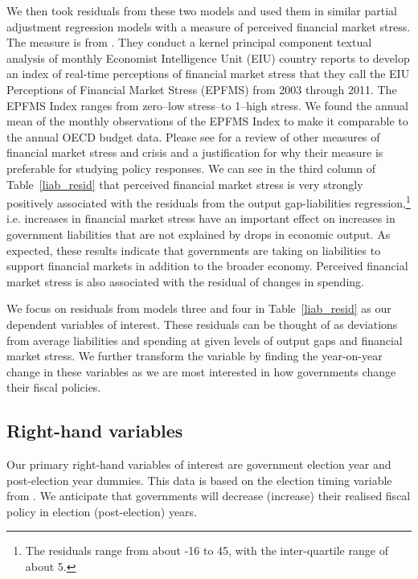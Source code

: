 \documentclass[]{article}
\begin{document}
We then took residuals from these two models and used them in similar partial adjustment regression models with a measure of perceived financial market stress. The measure is from \cite{gandrudHallEPFMS}. They conduct a kernel principal component textual analysis \citep{Spirling2012} of monthly Economist Intelligence Unit (EIU) country reports to develop an index of real-time perceptions of financial market stress that they call the EIU Perceptions of Financial Market Stress (EPFMS) from 2003 through 2011. The EPFMS Index ranges from zero--low stress--to 1--high stress. We found the annual mean of the monthly observations of the EPFMS Index to make it comparable to the annual OECD budget data. Please see \cite{gandrudHallEPFMS} for a review of other measures of financial market stress and crisis and a justification for why their measure is preferable for studying policy responses. We can see in the third column of Table~\ref{liab_resid} that perceived financial market stress is very strongly positively associated with the residuals from the output gap-liabilities regression,\footnote{The residuals range from about -16 to 45, with the inter-quartile range of about 5.} i.e. increases in financial market stress have an important effect on increases in government liabilities that are not explained by drops in economic output. As expected, these results indicate that governments are taking on liabilities to support financial markets in addition to the broader economy. Perceived financial market stress is also associated with the residual of changes in spending.

We focus on residuals from models three and four in Table~\ref{liab_resid} as our dependent variables of interest. These residuals can be thought of as deviations from average liabilities and spending at given levels of output gaps and financial market stress. We further transform the variable by finding the year-on-year change in these variables as we are most interested in how governments change their fiscal policies.

\subsection*{Right-hand variables}

Our primary right-hand variables of interest are government election year and post-election year dummies. This data is based on the election timing variable from \cite{gandrudYrcurnt}. We anticipate that governments will decrease (increase) their realised fiscal policy in election (post-election) years.
\end{document}
